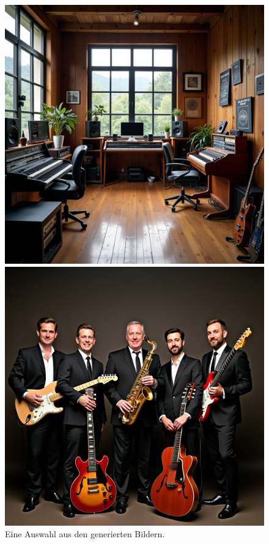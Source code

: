 \begin{figure}
\begin{minipage}{0.24\textwidth}
    \end{minipage}
    \begin{minipage}{0.24\textwidth}
        \centering
        \includegraphics[width=\textwidth]{bilder/synth_7_3.5_7.png}
    \end{minipage}
    \begin{minipage}{0.24\textwidth}
        \centering
        \includegraphics[width=\textwidth]{bilder/synth_9_4.5_13.png}
    \end{minipage}
    \caption{Eine Auswahl aus den generierten Bildern.}
    \label{fig:collected_images}
\end{figure}

